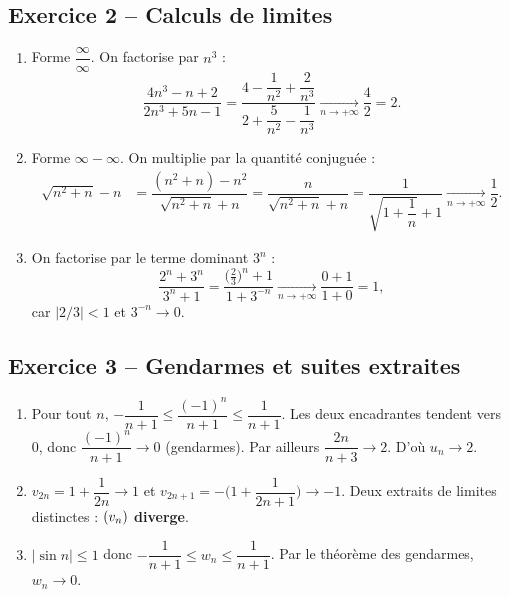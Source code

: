 \documentclass[11pt,a4paper]{article}
\begin{document}
\subsection{Exercice 2 -- Calculs de limites}

\begin{enumerate}
  \item Forme $\dfrac{\infty}{\infty}$. On factorise par $n^3$ :
  \[
  \dfrac{4n^3-n+2}{2n^3+5n-1}
  = \dfrac{4-\dfrac{1}{n^2}+\dfrac{2}{n^3}}{2+\dfrac{5}{n^2}-\dfrac{1}{n^3}}
  \xrightarrow[n\to+\infty]{} \dfrac{4}{2} = 2.
  \]

  \item Forme $\infty-\infty$. On multiplie par la quantité conjuguée :
  \begin{align*}
  \sqrt{n^2+n}-n
  &= \dfrac{(n^2+n)-n^2}{\sqrt{n^2+n}+n}
  = \dfrac{n}{\sqrt{n^2+n}+n}
  = \dfrac{1}{\sqrt{1+\dfrac{1}{n}}+1}
  \xrightarrow[n\to+\infty]{} \dfrac{1}{2}.
  \end{align*}

  \item On factorise par le terme dominant $3^n$ :
  \[
  \dfrac{2^n+3^n}{3^n+1}
  = \dfrac{\bigl(\tfrac{2}{3}\bigr)^n + 1}{1 + 3^{-n}}
  \xrightarrow[n\to+\infty]{} \dfrac{0+1}{1+0} = 1,
  \]
  car $\lvert 2/3\rvert<1$ et $3^{-n}\to 0$.
\end{enumerate}

\subsection{Exercice 3 -- Gendarmes et suites extraites}

\begin{enumerate}
  \item Pour tout $n$, $-\dfrac{1}{n+1}\leq \dfrac{(-1)^n}{n+1}\leq \dfrac{1}{n+1}$. Les deux encadrantes tendent vers $0$, donc $\dfrac{(-1)^n}{n+1}\to 0$ (gendarmes). Par ailleurs $\dfrac{2n}{n+3}\to 2$. D'où $u_n\to 2$.

  \item $v_{2n} = 1+\dfrac{1}{2n} \to 1$ et $v_{2n+1} = -\bigl(1+\dfrac{1}{2n+1}\bigr) \to -1$. Deux extraits de limites distinctes : $(v_n)$ \textbf{diverge}.

  \item $\lvert\sin n\rvert\leq 1$ donc $-\dfrac{1}{n+1}\leq w_n \leq \dfrac{1}{n+1}$. Par le théorème des gendarmes, $w_n\to 0$.
\end{enumerate}
\end{document}
